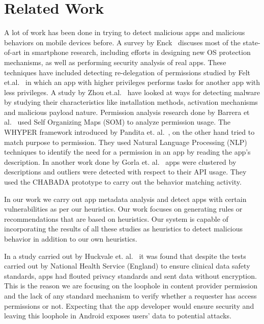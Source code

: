 \section{Related Work}
\label{RelatedWork}
\noindent
A lot of work has been done in trying to detect malicious apps and malicious behaviors on mobile devices before. A survey by Enck~\cite{Enck2011Defending} discuses most of the state-of-art in smartphone research, including efforts in designing new OS protection mechanisms, as well as performing security analysis of real apps. These techniques have included detecting re-delegation of permissions studied by Felt et.al.~\cite{Felt11permissionReDelegation} in which an app with higher privileges performs tasks for another app with less privileges. A study by Zhou et.al.~\cite{Zhou2012MalwareGenomeProject} have looked at ways for detecting malware by studying their characteristics like installation methods, activation mechanisms and malicious payload nature. Permission analysis research done by Barrera et al.~\cite{Barrera2010SOM} used Self Organizing Maps (SOM) to analyze permission usage. The WHYPER framework introduced by Pandita et. al.~\cite{Pandita2013Whyper}, on the other hand tried to match purpose to permission. They used Natural Language Processing (NLP) techniques to identify the need for a permission in an app by reading the app's description. In another work done by Gorla et. al.~\cite{GorlaCheckingAppBehavior2014} apps were clustered by descriptions and outliers were detected with respect to their API usage. They used the CHABADA prototype to carry out the behavior matching activity. 

In our work we carry out app metadata analysis and detect apps with certain vulnerabilities as per our heuristics. Our work focuses on generating rules or recommendations that are based on heuristics. Our system is capable of incorporating the results of all these studies as heuristics to detect malicious behavior in addition to our own heuristics.

In a study carried out by Huckvale et. al.~\cite{Huckvale2012Apps} it was found that despite the tests carried out by National Health Service (England) to ensure clinical data safety standards, apps had flouted privacy standards and sent data without encryption. This is the reason we are focusing on the loophole in content provider permission and the lack of any standard mechanism to verify whether a requester has access permissions or not. Expecting that the app developer would ensure security and leaving this loophole in Android exposes users' data to potential attacks.

